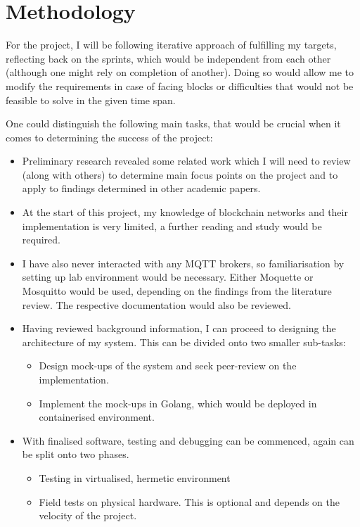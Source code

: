 \documentclass[a4paper,12pt]{article}
\begin{document}
\section*{Methodology}

For the project, I will be following iterative approach of fulfilling my targets, reflecting back on the sprints, which would be independent from each other (although one might rely on completion of another). Doing so would allow me to modify the requirements in case of facing blocks or difficulties that would not be feasible to solve in the given time span.

One could distinguish the following main tasks, that would be crucial when it comes to determining the success of the project:
\begin{itemize}
  \item Preliminary research revealed some related work which I will need to review (along with others) to determine main focus points on the project and to apply to findings determined in other academic papers.
  \item At the start of this project, my knowledge of blockchain networks and their implementation is very limited, a further reading and study would be required.
  \item I have also never interacted with any MQTT brokers, so familiarisation by setting up lab environment would be necessary. Either Moquette or Mosquitto would be used, depending on the findings from the literature review. The respective documentation would also be reviewed.
  \item Having reviewed background information, I can proceed to designing the architecture of my system. This can be divided onto two smaller sub-tasks:
    \begin{itemize}
      \item Design mock-ups of the system and seek peer-review on the implementation.
      \item Implement the mock-ups in Golang, which would be deployed in containerised environment.
    \end{itemize}
  \item With finalised software, testing and debugging can be commenced, again can be split onto two phases.
    \begin{itemize}
      \item Testing in virtualised, hermetic environment
      \item Field tests on physical hardware. This is optional and depends on the velocity of the project.
    \end{itemize}
\end{itemize}
\end{document}
